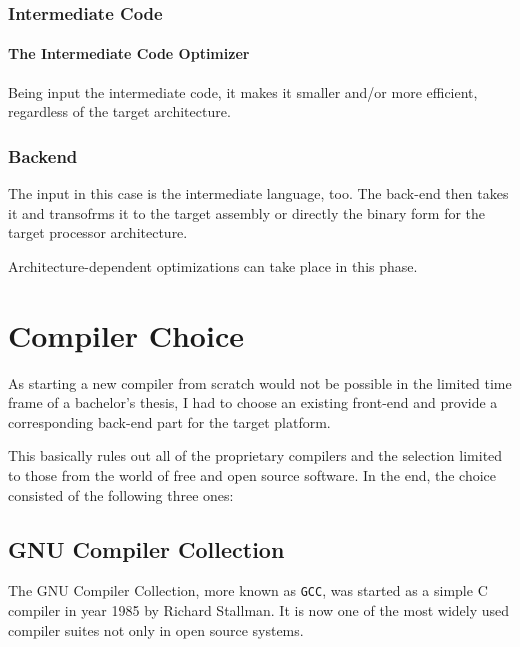         \subsection{Intermediate Code}

            \subsubsection{The Intermediate Code Optimizer}

                Being input the intermediate code, it makes it smaller and/or more efficient, regardless of the target architecture.

        \subsection{Back\-end}

            The input in this case is the intermediate language, too. The back-end then takes it and transofrms it to the target assembly or directly the binary form for the target processor architecture.

            Architecture-dependent optimizations can take place in this phase.

\chapter{Compiler Choice}\label{compiler}

As starting a new compiler from scratch would not be possible in the limited time frame of a bachelor's thesis, I had to choose an existing front-end and provide a corresponding back-end part for the target platform.

This basically rules out all of the proprietary compilers and the selection limited to those from the world of free and open source software. In the end, the choice consisted of the following three ones:


    \section{GNU Compiler Collection}\label{gcc}

    The GNU Compiler Collection, more known as \texttt{GCC}, was started as a simple C compiler in year 1985 by Richard Stallman. It is now one of the most widely used compiler suites not only in open source systems.

